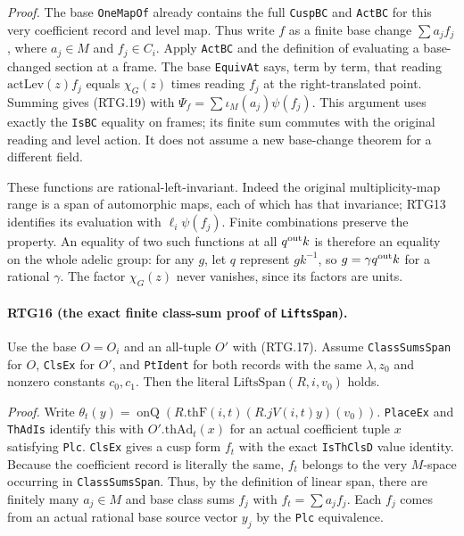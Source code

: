 \emph{Proof.}
The base \texttt{OneMapOf} already contains the full \texttt{CuspBC}
and \texttt{ActBC} for this very coefficient record and level map.
Thus write $f$ as a finite base change $\sum a_j f_j$, where
$a_j\in M$ and $f_j\in C_i$.  Apply \texttt{ActBC} and the definition
of evaluating a base-changed section at a frame.  The base
\texttt{EquivAt} says, term by term, that reading
$\mathrm{actLev}(z)f_j$ equals $\chi_G(z)$ times reading $f_j$
at the right-translated point.  Summing gives (RTG.19) with
$\Psi_f=\sum\iota_M(a_j)\psi(f_j)$.
This argument uses exactly the \texttt{IsBC} equality on frames; its
finite sum commutes with the original reading and level action.
It does not assume a new base-change theorem for a different field.

These functions are rational-left-invariant.  Indeed the original
multiplicity-map range is a span of automorphic maps, each of which has
that invariance; RTG13 identifies its evaluation with
$\ell_i\psi(f_j)$.  Finite combinations preserve the property.
An equality of two such functions at all $q^{\rm out}k$ is therefore
an equality on the whole adelic group: for any $g$, let $q$ represent
$gk^{-1}$, so $g=\gamma q^{\rm out}k$ for a rational $\gamma$.
The factor $\chi_G(z)$ never vanishes, since its factors are units.

\paragraph{RTG16 (the exact finite class-sum proof of \texttt{LiftsSpan}).}
\label{claim:RTG16}
Use the base $O=O_i$ and an all-tuple $O'$ with (RTG.17).
Assume \texttt{ClassSumsSpan} for $O$, \texttt{ClsEx} for $O'$, and
\texttt{PtIdent} for both records with the same $\lambda,z_0$ and
nonzero constants $c_0,c_1$.  Then the literal
\(\mathrm{LiftsSpan}(R,i,v_0)\) holds.

\emph{Proof.}
Write $\theta_t(y)=\operatorname{onQ}(R.\mathrm{thF}(i,t)
(R.jV(i,t)y)(v_0))$.  \texttt{PlaceEx} and \texttt{ThAdIs} identify
this with $O'.\mathrm{thAd}_t(x)$ for an actual coefficient tuple
$x$ satisfying \texttt{Plc}.  \texttt{ClsEx} gives a cusp form $f_t$
with the exact \texttt{IsThClsD} value identity.  Because the coefficient
record is literally the same, $f_t$ belongs to the very $M$-space
occurring in \texttt{ClassSumsSpan}.  Thus, by the definition of linear
span, there are finitely many $a_j\in M$ and base class sums $f_j$
with $f_t=\sum a_j f_j$.  Each $f_j$ comes from an actual rational
base source vector $y_j$ by the \texttt{Plc} equivalence.

